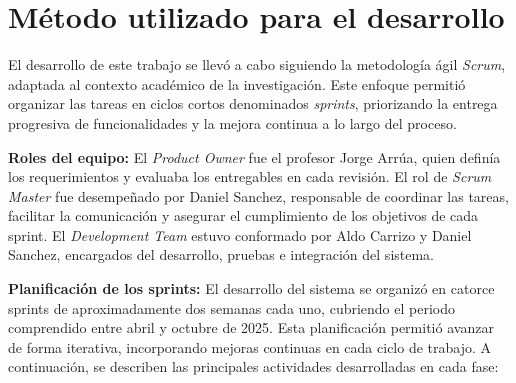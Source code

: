 \section{Método utilizado para el desarrollo}

El desarrollo de este trabajo se llevó a cabo siguiendo la metodología ágil \textit{Scrum}, adaptada al contexto académico de la investigación. Este enfoque permitió organizar las tareas en ciclos cortos denominados \textit{sprints}, priorizando la entrega progresiva de funcionalidades y la mejora continua a lo largo del proceso.

\textbf{Roles del equipo:} El \textit{Product Owner} fue el profesor Jorge Arrúa, quien definía los requerimientos y evaluaba los entregables en cada revisión. El rol de \textit{Scrum Master} fue desempeñado por Daniel Sanchez, responsable de coordinar las tareas, facilitar la comunicación y asegurar el cumplimiento de los objetivos de cada sprint. El \textit{Development Team} estuvo conformado por Aldo Carrizo y Daniel Sanchez, encargados del desarrollo, pruebas e integración del sistema.

\textbf{Planificación de los sprints:} El desarrollo del sistema se organizó en catorce sprints de aproximadamente dos semanas cada uno, cubriendo el periodo comprendido entre abril y octubre de 2025. Esta planificación permitió avanzar de forma iterativa, incorporando mejoras continuas en cada ciclo de trabajo.
A continuación, se describen las principales actividades desarrolladas en cada fase:

